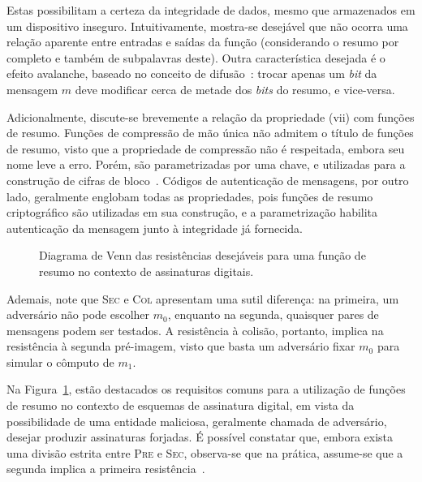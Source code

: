 \documentclass{ufsctex/ufsctex}
\def\precircle{(0.00, 0) circle (1.25cm)}
\def\seccircle{(1.75, 0) circle (1.25cm)}
\def\colcircle{(1.75, 0) circle (0.75cm)}
\begin{document}
Estas possibilitam a certeza da integridade de dados, mesmo que armazenados em
um dispositivo inseguro. Intuitivamente, mostra-se desejável que não ocorra uma
relação aparente entre entradas e saídas da função (considerando o resumo por
completo e também de subpalavras deste). Outra característica desejada é o
efeito avalanche, baseado no conceito de
difusão~\cite{Stallings:2010:CNS:1824151}: trocar apenas um \emph{bit} da
mensagem $m$ deve modificar cerca de metade dos \emph{bits} do resumo, e
vice-versa.

Adicionalmente, discute-se brevemente a relação da propriedade (vii) com
funções de resumo. Funções de compressão de mão única não admitem o título de
funções de resumo, visto que a propriedade de compressão não é respeitada,
embora seu nome leve a erro. Porém, são parametrizadas por uma chave, e
utilizadas para a construção de cifras de
bloco~\cite[9.25]{Menezes:1996:HAC:548089}. Códigos de autenticação de
mensagens, por outro lado, geralmente englobam todas as propriedades, pois
funções de resumo criptográfico são utilizadas em sua construção, e a
parametrização habilita autenticação da mensagem junto à integridade já
fornecida.

\begin{figure}[h]
  \centering
  \caption{Diagrama de Venn das resistências desejáveis para uma função de
    resumo no contexto de assinaturas digitais.}\label{fig:1}
\end{figure}

Ademais, note que \textsc{Sec} e \textsc{Col} apresentam uma sutil diferença:
na primeira, um adversário não pode escolher $m_0$, enquanto na segunda,
quaisquer pares de mensagens podem ser testados. A resistência à colisão,
portanto, implica na resistência à segunda pré-imagem, visto que basta um
adversário fixar $m_0$ para simular o cômputo de $m_1$.

Na Figura~\ref{fig:1}, estão destacados os requisitos comuns para a utilização
de funções de resumo no contexto de esquemas de assinatura digital, em vista da
possibilidade de uma entidade maliciosa, geralmente chamada de adversário,
desejar produzir assinaturas forjadas. É possível constatar que, embora exista
uma divisão estrita entre \textsc{Pre} e \textsc{Sec}, observa-se que na
prática, assume-se que a segunda implica a primeira
resistência~\cite[9.20]{Menezes:1996:HAC:548089}.
\end{document}
